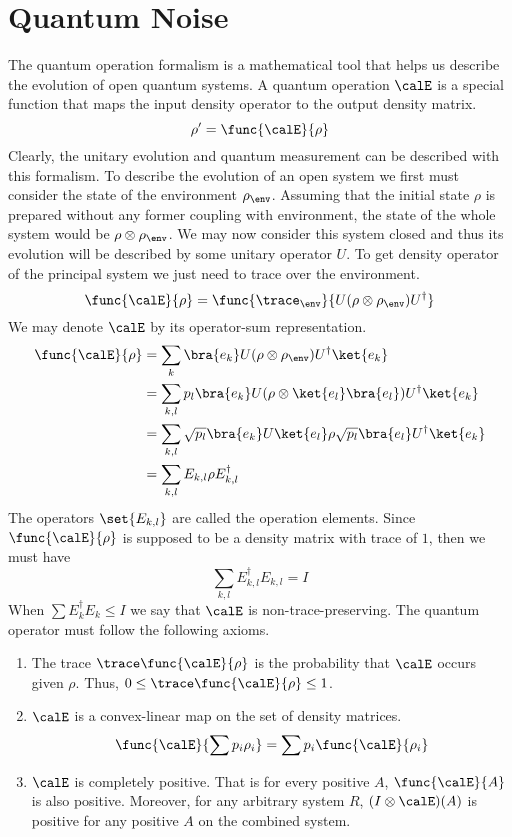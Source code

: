 \chapter{Quantum Noise}
The quantum operation formalism is a mathematical tool that helps us describe the evolution of open quantum systems. A quantum operation \(\calE\) is a special function that maps the input density operator to the output density matrix.
\begin{equation*}
    \rho'= \func{\calE}{\rho}
\end{equation*}
Clearly, the unitary evolution and quantum measurement can be described with this formalism. To describe the evolution of an open system we first must consider the state of the environment \(\rho_{\env}\). Assuming that the initial state \(\rho\) is prepared without any former coupling with environment, the state of the whole system would be \(\rho \otimes \rho_{\env}\). We may now consider this system closed and thus its evolution will be described by some unitary operator \(U\). To get density operator of the principal system we just need to trace over the environment.
\begin{equation*}
    \func{\calE}{\rho} = \func{\trace_{\env}}{U (\rho \otimes \rho_{\env}) U^{\dagger}} 
\end{equation*}
We may denote \(\calE\) by its operator-sum representation.
\begin{align*}
    \func{\calE}{\rho} &= \sum_k \bra{e_k} U (\rho \otimes \rho_{\env}) U^{\dagger} \ket{e_k}\\
    &= \sum_{k,l} p_l \bra{e_k} U (\rho \otimes \ket{e_l}\bra{e_l}) U^{\dagger} \ket{e_k}\\
    &= \sum_{k,l} \sqrt{p_l}\bra{e_k}U\ket{e_l} \rho \sqrt{p_l}\bra{e_l}U^{\dagger} \ket{e_k}\\
    &= \sum_{k,l} E_{k,l} \rho E_{k,l}^{\dagger}
\end{align*}
The operators \(\set{E_{k,l}}\) are called the operation elements. Since \(\func{\calE}{\rho}\) is supposed to be a density matrix with trace of \(1\), then we must have 
\begin{equation*}
    \sum_{k,l} E_{k,l}^{\dagger} E_{k,l} = I
\end{equation*}
When \(\sum E_{k}^{\dagger} E_k \leq I\) we say that \(\calE\) is non-trace-preserving. The quantum operator must follow the following axioms.
\begin{enumerate}
    \item The trace \(\trace \func{\calE}{\rho}\) is the probability that \(\calE\) occurs given \(\rho\). Thus, \(0 \leq \trace \func{\calE}{\rho} \leq 1\).
    \item \(\calE\) is a convex-linear map on the set of density matrices.
    \begin{equation*}
        \func{\calE}{\sum p_i \rho_i} = \sum p_i \func{\calE}{\rho_i}
    \end{equation*}
    \item \(\calE\) is completely positive. That is for every positive \(A\), \(\func{\calE}{A}\) is also positive. Moreover, for any arbitrary system \(R\), \((I \otimes \calE)(A)\) is positive for any positive \(A\) on the combined system.
\end{enumerate}